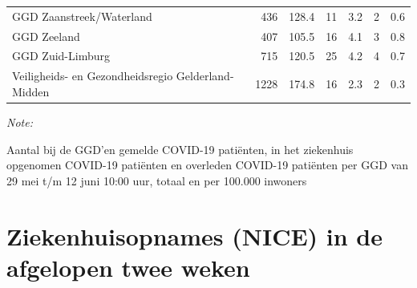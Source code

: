 \documentclass[
  english,
  man,floatsintext]{apa6}
\begin{document}
\begin{table}
\begin{threeparttable}
\begin{tabular}{lrrrrrr}
GGD Zaanstreek/Waterland & 436 & 128.4 & 11 & 3.2 & 2 & 0.6\\
GGD Zeeland & 407 & 105.5 & 16 & 4.1 & 3 & 0.8\\
GGD Zuid-Limburg & 715 & 120.5 & 25 & 4.2 & 4 & 0.7\\
Veiligheids- en Gezondheidsregio Gelderland-Midden & 1228 & 174.8 & 16 & 2.3 & 2 & 0.3\\
\bottomrule
\end{tabular}
\begin{tablenotes}
\item \textit{Note: } 
\item Aantal bij de GGD’en gemelde COVID-19 patiënten, in het ziekenhuis opgenomen COVID-19 patiënten en overleden COVID-19 patiënten per GGD van 29 mei t/m 12 juni 10:00 uur, totaal en per 100.000 inwoners
\end{tablenotes}
\end{threeparttable}
\endgroup{}
\end{table}

\newpage

\hypertarget{ziekenhuisopnames-nice-in-de-afgelopen-twee-weken}{%
\section{Ziekenhuisopnames (NICE) in de afgelopen twee weken}\label{ziekenhuisopnames-nice-in-de-afgelopen-twee-weken}}
\end{document}
